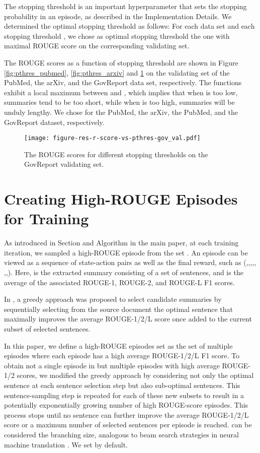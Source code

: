 \documentclass[11pt]{article}
\begin{document}
The stopping threshold  is an important hyperparameter that sets the stopping probability in an episode, as described in the Implementation Details. We determined the optimal stopping threshold  as follows: For each data set and each stopping threshold , we chose as optimal stopping threshold  the one with maximal ROUGE score on the corresponding validating set. 

The ROUGE scores as a function of stopping threshold are shown in Figure \ref{fig:pthres_pubmed}, \ref{fig:pthres_arxiv} and \ref{fig:pthres_govreport} on the validating set of the PubMed, the arXiv, and the GovReport data set, respectively. The functions exhibit a local maximum between  and , which implies that when  is too low, summaries tend to be too short, while when  is too high, summaries will be unduly lengthy. We chose  for the PubMed, the arXiv, the PubMed, and the GovReport dataset, respectively.

\begin{figure}[ht]
\centering
  \texttt{[image: figure-res-r-score-vs-pthres-gov\_val.pdf]}
  \caption{The ROUGE scores for different stopping thresholds  on the GovReport validating set.}
  \label{fig:pthres_govreport}
\end{figure}


\section{Creating High-ROUGE Episodes for Training}
\label{sec:high_rouge}
As introduced in Section  and Algorithm  in the main paper, at each training iteration, we sampled a high-ROUGE episode from the set . An episode can be viewed as a sequence of state-action pairs as well as the final reward, such as  (,,,,, ,,). Here,  is the extracted summary consisting of a set of  sentences, and  is the average of the associated ROUGE-1, ROUGE-2, and ROUGE-L F1 scores.

In \cite{nallapati2016summarunner}, a greedy approach was proposed to select candidate summaries by sequentially selecting from the source document the optimal sentence that maximally improves the average ROUGE-1/2/L score once added to the current subset of selected sentences.

In this paper, we define a high-ROUGE episodes set  as the set of multiple episodes where each episode has a high average ROUGE-1/2/L F1 score. To obtain not a single episode in  but multiple episodes with high average ROUGE-1/2 scores, we modified the greedy approach by considering not only the optimal sentence at each sentence selection step but also  sub-optimal sentences. This sentence-sampling step is repeated for each of these  new subsets to result in a potentially exponentially growing number of high ROUGE-score episodes. This process stops until no sentence can further improve the average ROUGE-1/2/L score or a maximum number  of selected sentences per episode is reached.  can be considered the branching size, analogous to beam search strategies in neural machine translation \cite{sutskever2014sequence,freitag2017beam}. We set  by default.
\end{document}

